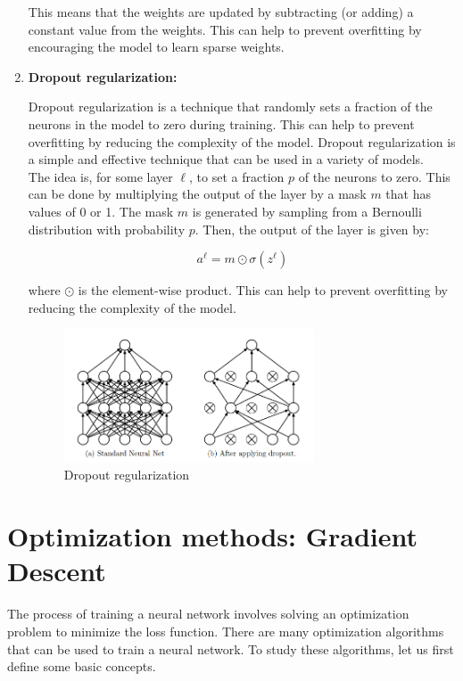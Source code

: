 \begin{enumerate}
    This means that the weights are updated by subtracting (or adding) a constant value from
    the weights. This can help to prevent overfitting by encouraging the model to learn
    sparse weights.\\


    \item \textbf{Dropout regularization:}
    
    Dropout regularization is a technique that randomly sets a fraction of the
    neurons in the model to zero during training. This can help to prevent
    overfitting by reducing the complexity of the model. Dropout regularization
    is a simple and effective technique that can be used in a variety of models.\\

    The idea is, for some layer $\ell$, to set a fraction $p$ of the neurons to zero.
    This can be done by multiplying the output of the layer by a mask $m$ that has
    values of 0 or 1. The mask $m$ is generated by sampling from a Bernoulli distribution
    with probability $p$. Then, the output of the layer is given by:

    $$a^\ell = m \odot \sigma(z^\ell)$$

    where $\odot$ is the element-wise product. This can help to prevent overfitting
    by reducing the complexity of the model.

    \begin{figure}[H]
        \centering
        \includegraphics[width=0.7\textwidth]{figures/dropout.png}
        \caption{Dropout regularization}
        \label{fig:dropout}
    \end{figure}

\end{enumerate}

\section{Optimization methods: Gradient Descent}

The process of training a neural network involves solving an optimization problem
to minimize the loss function. There are many optimization algorithms that can be
used to train a neural network. To study these algorithms, let us first define
some basic concepts.\\

